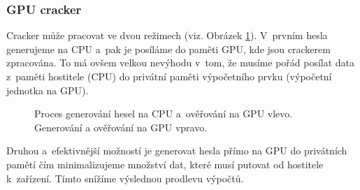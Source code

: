 \subsubsection{GPU cracker}
Cracker může pracovat ve dvou režimech (viz. Obrázek \ref{CPUGPU}). V~prvním hesla generujeme na
CPU a~pak je posíláme do paměti GPU, kde jsou crackerem zpracována. To má ovšem velkou nevýhodu
v~tom, že musíme pořád posílat data z~paměti hostitele (CPU) do privátní paměti výpočetního prvku
(výpočetní jednotka na GPU).
\begin{figure}[ht]
    \begin{center}
    \end{center}
    \caption{Proces generování hesel na CPU a~ověřování na GPU vlevo. Generování a
	ověřování na GPU vpravo.\cite{Schmied}}
    \label{CPUGPU}
\end{figure}

 Druhou a~efektivnější možností je generovat hesla přímo na GPU do privátních pamětí čím
minimalizujeme množství dat, které musí putovat od hostitele k~zařízení. Tímto snížíme výslednou
prodlevu výpočtů.

